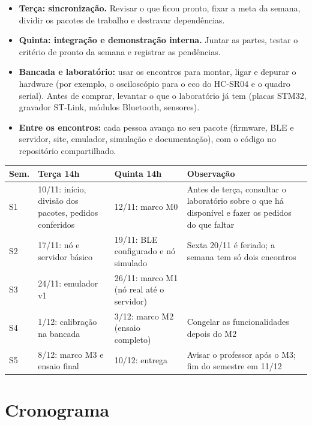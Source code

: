 \documentclass[11pt,a4paper]{article}
\begin{document}
\begin{itemize}
  \item \textbf{Terça: sincronização.} Revisar o que ficou pronto, fixar a meta da
        semana, dividir os pacotes de trabalho e destravar dependências.
  \item \textbf{Quinta: integração e demonstração interna.} Juntar as partes, testar
        o critério de pronto da semana e registrar as pendências.
  \item \textbf{Bancada e laboratório:} usar os encontros para montar, ligar e depurar o
        hardware (por exemplo, o osciloscópio para o eco do HC-SR04 e o quadro serial). Antes de
        comprar, levantar o que o laboratório já tem (placas STM32, gravador ST-Link, módulos
        Bluetooth, sensores).
  \item \textbf{Entre os encontros:} cada pessoa avança no seu pacote (firmware,
        BLE e servidor, site, emulador, simulação e documentação), com o código no
        repositório compartilhado.
\end{itemize}

\begin{center}
\begin{tabular}{|L{1.0cm}|L{4.3cm}|L{4.3cm}|L{5.4cm}|}
\hline
\textbf{Sem.} & \textbf{Terça 14h} & \textbf{Quinta 14h} & \textbf{Observação} \\ \hline
S1 & 10/11: início, divisão dos pacotes, pedidos conferidos & 12/11: marco M0 & Antes de terça, consultar o laboratório sobre o que há disponível e fazer os pedidos do que faltar \\ \hline
S2 & 17/11: nó e servidor básico & 19/11: BLE configurado e nó simulado & Sexta 20/11 é feriado; a semana tem só dois encontros \\ \hline
S3 & 24/11: emulador v1 & 26/11: marco M1 (nó real até o servidor) & \\ \hline
S4 & 1/12: calibração na bancada & 3/12: marco M2 (ensaio completo) & Congelar as funcionalidades depois do M2 \\ \hline
S5 & 8/12: marco M3 e ensaio final & 10/12: entrega & Avisar o professor após o M3; fim do semestre em 11/12 \\ \hline
\end{tabular}
\end{center}

\section{Cronograma}
\end{document}
